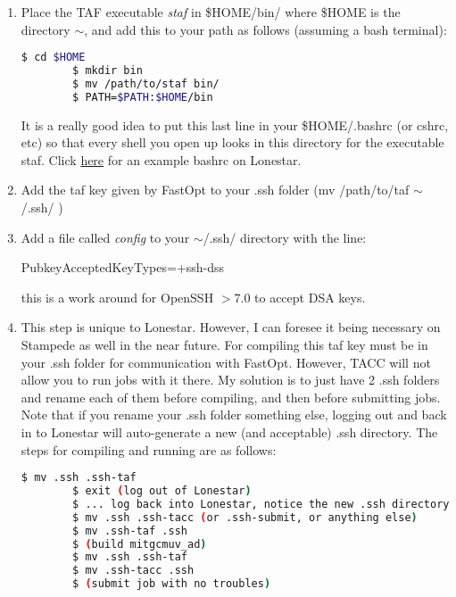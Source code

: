 \documentclass[a4paper,11pt]{article}
\begin{document}
	\begin{enumerate}
	  \item Place the TAF executable \textit{staf} in \$HOME/bin/ where \$HOME is the directory $\sim$, and add this to your path as follows (assuming a bash terminal): 

	  \begin{lstlisting}[language=bash]
		$ cd $HOME
		$ mkdir bin
		$ mv /path/to/staf bin/
	 	$ PATH=$PATH:$HOME/bin
	  \end{lstlisting}

	It is a really good idea to put this last line in your \$HOME/.bashrc (or cshrc, etc) so that every shell you open up looks in this directory for the executable staf. Click \href{http://users.ices.utexas.edu/~tsmith/bash-scripts/bashrc_tsmith_lonestar}{here} for an example bashrc on Lonestar.

	\item Add the taf key given by FastOpt to your .ssh folder (mv /path/to/taf $\sim$/.ssh/ )

	\item Add a file called \textit{config} to your $\sim$/.ssh/ directory with the line:

	PubkeyAcceptedKeyTypes=+ssh-dss

	this is a work around for OpenSSH $>$7.0 to accept DSA keys.
	
	\item This step is unique to Lonestar. However, I can foresee it being necessary on Stampede as well in the near future. For compiling this taf key must be in your .ssh folder for communication with FastOpt. However, TACC will not allow you to run jobs with it there. My solution is to just have 2 .ssh folders and rename each of them before compiling, and then before submitting jobs. Note that if you rename your .ssh folder something else, logging out and back in to Lonestar will auto-generate a new (and acceptable) .ssh directory. The steps for compiling and running are as follows:  

	  \begin{lstlisting}[language=bash]
		$ mv .ssh .ssh-taf
		$ exit (log out of Lonestar) 
		$ ... log back into Lonestar, notice the new .ssh directory
		$ mv .ssh .ssh-tacc (or .ssh-submit, or anything else) 
		$ mv .ssh-taf .ssh
		$ (build mitgcmuv_ad) 
		$ mv .ssh .ssh-taf 
		$ mv .ssh-tacc .ssh
		$ (submit job with no troubles) 

	  \end{lstlisting} 

	\end{enumerate}
	
\end{document}
